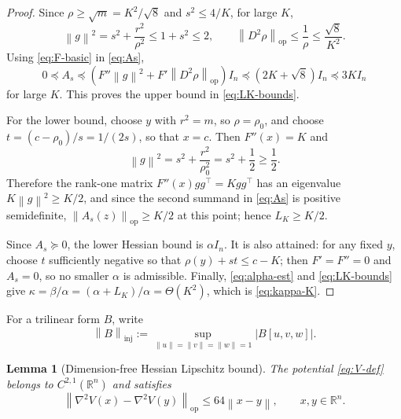 \documentclass[11pt]{article}
\theoremstyle{plain}
\newtheorem{lemma}[theorem]{Lemma}
\theoremstyle{definition}
\theoremstyle{remark}
\newcommand{\R}{\mathbb{R}}
\newcommand{\op}{\mathrm{op}}
\newcommand{\inj}{\mathrm{inj}}
\newcommand{\Id}{I}
\newcommand{\1}{\mathbf{1}}
\newcommand{\norm}[1]{\left\lVert #1\right\rVert}
\newcommand{\abs}[1]{\left\lvert #1\right\rvert}
\begin{document}
\begin{proof}
Since $\rho\geq\sqrt m=K^2/\sqrt8$ and
$s^2\leq4/K$, for large $K$,
\[
    \norm g^2
    =
    s^2+\frac{r^2}{\rho^2}
    \leq
    1+s^2
    \leq2,
    \qquad
    \norm{D^2\rho}_{\op}
    \leq
    \frac1\rho
    \leq
    \frac{\sqrt8}{K^2}.
\]
Using \eqref{eq:F-basic} in \eqref{eq:As},
\[
    0\preceq A_s
    \preceq
    \left(F''\norm g^2+F'\norm{D^2\rho}_{\op}\right)\Id_n
    \preceq
    \left(2K+\sqrt8\right)\Id_n
    \preceq
    3K\Id_n
\]
for large $K$. This proves the upper bound in \eqref{eq:LK-bounds}.

For the lower bound, choose $y$ with $r^2=m$, so $\rho=\rho_0$, and
choose $t=(c-\rho_0)/s=1/(2s)$, so that $x=c$. Then $F''(x)=K$ and
\[
    \norm g^2
    =
    s^2+\frac{r^2}{\rho_0^2}
    =
    s^2+\frac12
    \geq
    \frac12.
\]
Therefore the rank-one matrix $F''(x)gg^\top=Kgg^\top$ has an eigenvalue
$K\norm g^2\geq K/2$, and since the second summand in \eqref{eq:As} is
positive semidefinite, $\norm{A_s(z)}_{\op}\geq K/2$ at this point; hence
$L_K\geq K/2$.

Since $A_s\succeq0$, the lower Hessian bound is $\alpha\Id_n$. It is
also attained: for any fixed $y$, choose $t$ sufficiently negative so
that $\rho(y)+st\leq c-K$; then $F'=F''=0$ and $A_s=0$, so no smaller
$\alpha$ is admissible. Finally, \eqref{eq:alpha-est} and
\eqref{eq:LK-bounds} give $\kappa=\beta/\alpha=(\alpha+L_K)/\alpha=\Theta(K^2)$,
which is \eqref{eq:kappa-K}.
\end{proof}

For a trilinear form $B$, write
\[
    \norm B_{\inj}
    :=
    \sup_{\norm u=\norm v=\norm w=1}\abs{B[u,v,w]}.
\]

\begin{lemma}[Dimension-free Hessian Lipschitz bound]
\label{lem:H3}
The potential \eqref{eq:V-def} belongs to $C^{2,1}(\R^n)$ and satisfies
\begin{equation}
    \norm{\nabla^2V(x)-\nabla^2V(y)}_{\op}
    \leq
    64\norm{x-y},
    \qquad x,y\in\R^n.
    \label{eq:H3-64}
\end{equation}
\end{lemma}
\end{document}
